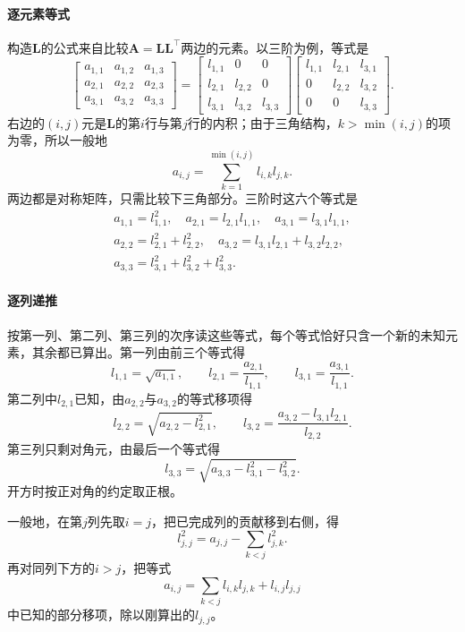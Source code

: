 \paragraph{逐元素等式}
构造$\bm L$的公式来自比较$\bm A=\bm L\bm L^\top$两边的元素。以三阶为例，等式是
\[
 \begin{bmatrix}a_{1,1}&a_{1,2}&a_{1,3}\\a_{2,1}&a_{2,2}&a_{2,3}\\a_{3,1}&a_{3,2}&a_{3,3}\end{bmatrix}
 =\begin{bmatrix}l_{1,1}&0&0\\l_{2,1}&l_{2,2}&0\\l_{3,1}&l_{3,2}&l_{3,3}\end{bmatrix}
 \begin{bmatrix}l_{1,1}&l_{2,1}&l_{3,1}\\0&l_{2,2}&l_{3,2}\\0&0&l_{3,3}\end{bmatrix}.
\]
右边的$(i,j)$元是$\bm L$的第$i$行与第$j$行的内积；由于三角结构，$k>\min(i,j)$的项为零，所以一般地
\[
 a_{i,j}=\sum_{k=1}^{\min(i,j)}l_{i,k}l_{j,k}.
\]
两边都是对称矩阵，只需比较下三角部分。三阶时这六个等式是
\[
\begin{gathered}
 a_{1,1}=l_{1,1}^2,\quad a_{2,1}=l_{2,1}l_{1,1},\quad a_{3,1}=l_{3,1}l_{1,1},\\
 a_{2,2}=l_{2,1}^2+l_{2,2}^2,\quad a_{3,2}=l_{3,1}l_{2,1}+l_{3,2}l_{2,2},\\
 a_{3,3}=l_{3,1}^2+l_{3,2}^2+l_{3,3}^2 .
\end{gathered}
\]

\paragraph{逐列递推}
按第一列、第二列、第三列的次序读这些等式，每个等式恰好只含一个新的未知元素，其余都已算出。第一列由前三个等式得
\[
 l_{1,1}=\sqrt{a_{1,1}},\qquad l_{2,1}=\frac{a_{2,1}}{l_{1,1}},\qquad l_{3,1}=\frac{a_{3,1}}{l_{1,1}} .
\]
第二列中$l_{2,1}$已知，由$a_{2,2}$与$a_{3,2}$的等式移项得
\[
 l_{2,2}=\sqrt{a_{2,2}-l_{2,1}^2},\qquad l_{3,2}=\frac{a_{3,2}-l_{3,1}l_{2,1}}{l_{2,2}} .
\]
第三列只剩对角元，由最后一个等式得
\[
 l_{3,3}=\sqrt{a_{3,3}-l_{3,1}^2-l_{3,2}^2} .
\]
开方时按正对角的约定取正根。

一般地，在第$j$列先取$i=j$，把已完成列的贡献移到右侧，得
\[
 l_{j,j}^2=a_{j,j}-\sum_{k<j}l_{j,k}^2 .
\]
再对同列下方的$i>j$，把等式
\[
 a_{i,j}=\sum_{k<j}l_{i,k}l_{j,k}+l_{i,j}l_{j,j}
\]
中已知的部分移项，除以刚算出的$l_{j,j}$。

